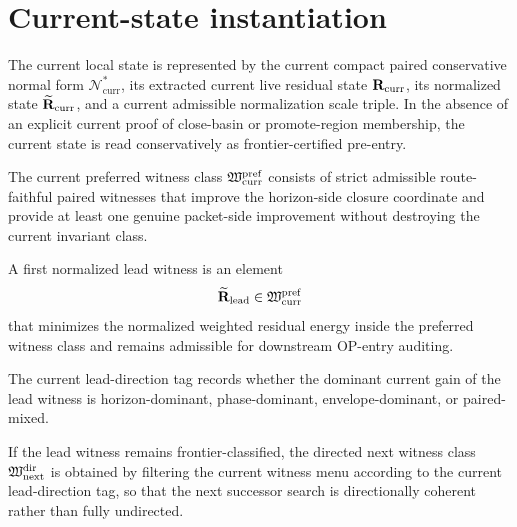 \section{Current-state instantiation}
\begin{definition}\label{def:current-frontier-preentry}
The current local state is represented by the current compact paired conservative normal form $\mathcal{N}^{\ast}_{\mathrm{curr}}$, its extracted current live residual state $\mathbf{R}_{\mathrm{curr}}$, its normalized state $\widetilde{\mathbf{R}}_{\mathrm{curr}}$, and a current admissible normalization scale triple. In the absence of an explicit current proof of close-basin or promote-region membership, the current state is read conservatively as frontier-certified pre-entry.
\end{definition}

\begin{definition}\label{def:preferred-witness-class}
The current preferred witness class $\mathfrak{W}^{\mathrm{pref}}_{\mathrm{curr}}$ consists of strict admissible route-faithful paired witnesses that improve the horizon-side closure coordinate and provide at least one genuine packet-side improvement without destroying the current invariant class.
\end{definition}

\begin{definition}\label{def:first-normalized-lead-witness}
A first normalized lead witness is an element
\[
\widetilde{\mathbf{R}}_{\mathrm{lead}}\in\mathfrak{W}^{\mathrm{pref}}_{\mathrm{curr}}
\]
that minimizes the normalized weighted residual energy inside the preferred witness class and remains admissible for downstream OP-entry auditing.
\end{definition}

\begin{definition}\label{def:lead-direction-tag}
The current lead-direction tag records whether the dominant current gain of the lead witness is horizon-dominant, phase-dominant, envelope-dominant, or paired-mixed.
\end{definition}

\begin{definition}\label{def:directed-next-witness-class}
If the lead witness remains frontier-classified, the directed next witness class $\mathfrak{W}^{\mathrm{dir}}_{\mathrm{next}}$ is obtained by filtering the current witness menu according to the current lead-direction tag, so that the next successor search is directionally coherent rather than fully undirected.
\end{definition}

